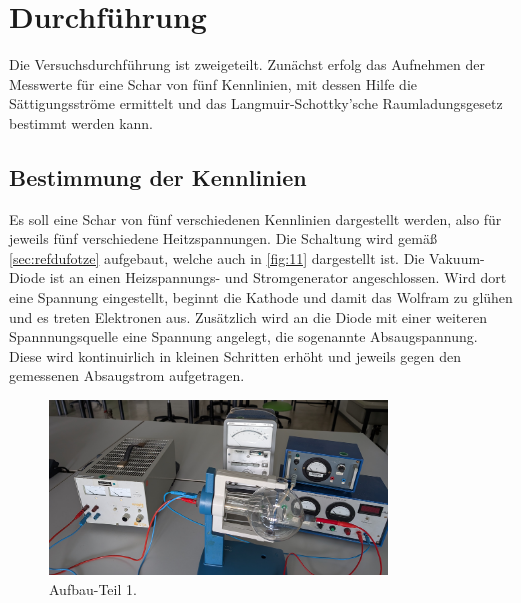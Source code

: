 \section{Durchführung}
\label{sec:Durchführung}

Die Versuchsdurchführung ist zweigeteilt. Zunächst erfolg das Aufnehmen der
Messwerte für eine Schar von fünf Kennlinien, mit dessen Hilfe die Sättigungsströme 
ermittelt und das Langmuir-Schottky’sche Raumladungsgesetz bestimmt werden kann.

\subsection{Bestimmung der Kennlinien}
\label{sec:1}
Es soll eine Schar von fünf verschiedenen Kennlinien dargestellt werden, 
also für jeweils fünf verschiedene Heitzspannungen. Die Schaltung wird gemäß
\autoref{sec:refdufotze} aufgebaut, welche auch in \autoref{fig:11} dargestellt ist.
Die Vakuum-Diode ist an einen Heizspannungs- und Stromgenerator angeschlossen.
Wird dort eine Spannung eingestellt, beginnt die Kathode und damit das Wolfram
zu glühen und es treten Elektronen aus.
Zusätzlich wird an die Diode mit einer weiteren Spannnungsquelle eine Spannung
angelegt, die sogenannte \glqq Absaugspannung\grqq{}. Diese wird kontinuirlich
in kleinen Schritten erhöht und jeweils gegen den gemessenen Absaugstrom
aufgetragen.
\begin{figure}[H]
    \centering
        \centering
        \includegraphics[width=0.8\textwidth]{Bilder/2.jpg}
        \caption{Aufbau-Teil 1.}
    \hfill
    \label{fig:11}
\end{figure}

